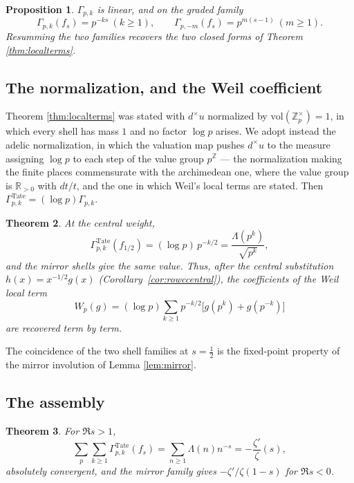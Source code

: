 \documentclass[11pt]{amsart}
\newtheorem{theorem}{Theorem}[section]
\newtheorem{proposition}[theorem]{Proposition}
\theoremstyle{definition}
\theoremstyle{remark}
\newcommand{\R}{\mathbb R}
\newcommand{\Z}{\mathbb Z}
\begin{document}
\begin{proposition}\label{prop:pairing3}
$\Gamma_{p,k}$ is linear, and on the graded family
\[
 \Gamma_{p,k}(f_s)=p^{-ks}\ (k\ge1),
 \qquad
 \Gamma_{p,-m}(f_s)=p^{m(s-1)}\ (m\ge1).
\]
Resumming the two families recovers the two closed forms of Theorem
\ref{thm:localterms}.
\end{proposition}

\subsection{The normalization, and the Weil coefficient}

Theorem \ref{thm:localterms} was stated with $d^\times u$ normalized by
$\mathrm{vol}(\Z_p^\times)=1$, in which every shell has mass $1$ and no
factor $\log p$ arises.  We adopt instead the adelic normalization, in which
the valuation map pushes $d^\times u$ to the measure assigning $\log p$ to
each step of the value group $p^{\Z}$ --- the normalization making the finite
places commensurate with the archimedean one, where the value group is
$\R_{>0}$ with $dt/t$, and the one in which Weil's local terms are stated.
Then $\Gamma^{\mathrm{Tate}}_{p,k}=(\log p)\Gamma_{p,k}$.

\begin{theorem}\label{thm:weilcoeff}
At the central weight,
\[
 \Gamma^{\mathrm{Tate}}_{p,k}(f_{1/2})=(\log p)\,p^{-k/2}
 =\frac{\Lambda(p^{k})}{\sqrt{p^{k}}},
\]
and the mirror shells give the same value.  Thus, after the central
substitution $h(x)=x^{-1/2}g(x)$ (Corollary~\ref{cor:rowccentral}), the
coefficients of the Weil local term
\[
 W_p(g)=(\log p)\sum_{k\ge1}p^{-k/2}
 \bigl[g(p^{k})+g(p^{-k})\bigr]
\]
are recovered term by term.
\end{theorem}

The coincidence of the two shell families at $s=\tfrac12$ is the fixed-point
property of the mirror involution of Lemma \ref{lem:mirror}.

\subsection{The assembly}

\begin{theorem}\label{thm:assembly}
For $\Re s>1$,
\[
 \sum_p\sum_{k\ge1}\Gamma^{\mathrm{Tate}}_{p,k}(f_s)
 =\sum_{n\ge1}\Lambda(n)n^{-s}
 =-\frac{\zeta'}{\zeta}(s),
\]
absolutely convergent, and the mirror family gives $-\zeta'/\zeta(1-s)$ for
$\Re s<0$.
\end{theorem}
\end{document}
